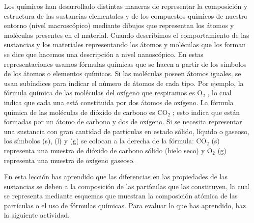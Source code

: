\documentclass[11pt]{book}
\begin{document}
Los químicos han desarrollado distintas maneras de representar la composición y
estructura de las sustancias elementales y de los compuestos químicos de nuestro
entorno (nivel macroscópico) mediante dibujos que representan los átomos y moléculas presentes en el material. Cuando describimos el comportamiento de las sustancias
y los materiales representando los átomos y moléculas que los forman se dice que
hacemos una descripción a nivel nanoscópico.
En estas representaciones usamos fórmulas químicas que se hacen a partir de los
símbolos de los átomos o elementos químicos. Si las moléculas poseen átomos iguales,
se usan subíndices para indicar el número de átomos de cada tipo. Por ejemplo, la
fórmula química de las moléculas del oxígeno que respiramos es O$_2$ , lo cual indica que
cada una está constituida por dos átomos de oxígeno. La fórmula química de las moléculas de dióxido de carbono es CO$_2$ ; esto indica que están formadas por un átomo de
carbono y dos de oxígeno. Si se necesita representar una sustancia con gran cantidad
de partículas en estado sólido, líquido o gaseoso, los símbolos (s), (l) y (g) se colocan a
la derecha de la fórmula: CO$_2$ (s) representa una muestra de dióxido de carbono sólido
(hielo seco) y O$_2$ (g) representa una muestra de oxígeno gaseoso.

En esta lección has aprendido que las diferencias en las propiedades de las sustancias
se deben a la composición de las partículas que las constituyen, la cual se representa
mediante esquemas que muestran la composición atómica de las partículas o el uso
de fórmulas químicas. Para evaluar lo que has aprendido, haz la siguiente actividad.
\end{document}
